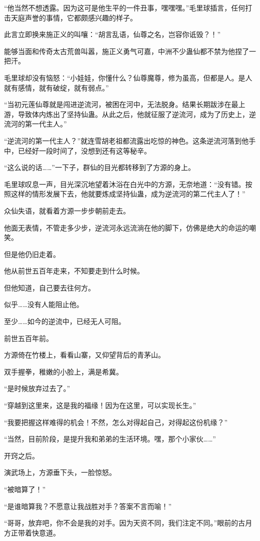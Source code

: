 \begin{this_body}
“他当然不想透露。因为这可是他生平的一件丑事，嘿嘿嘿。”毛里球插言，任何打击天庭声誉的事情，它都颇感兴趣的样子。

此言立即换来施正义的叫嚷：“胡言乱语，仙尊之名，岂容你诋毁？！”

能够当面和传奇太古荒兽叫嚣，施正义勇气可嘉，中洲不少蛊仙都不禁为他捏了一把汗。

毛里球却没有恼怒：“小娃娃，你懂什么？仙尊魔尊，修为虽高，但都是人。是人就有感情，就有破绽，就有弱点。”

“当初元莲仙尊就是闯进逆流河，被困在河中，无法脱身。结果长期跋涉在最上游，导致体内炼出了坚持仙蛊。从此之后，他就征服了逆流河，成为了历史上，逆流河的第一代主人。”

“逆流河的第一代主人？”就连雪胡老祖都流露出吃惊的神色。这条逆流河落到他手中，已经好一段时间了，没想到还有这等秘辛。

“这么说的话……”一下子，群仙的目光都转移到了方源的身上。

毛里球叹息一声，目光深沉地望着沐浴在白光中的方源，无奈地道：“没有错。按照这样的情形发展下去，他就要炼成坚持仙蛊，成为逆流河的第二代主人了！”

众仙失语，就看着方源一步步朝前走去。

他面无表情，不管走多少步，逆流河永远流淌在他的脚下，仿佛是绝大的命运的嘲笑。

但是他仍旧走着。

他从前世五百年走来，不知要走到什么时候。

但他知道，自己要去往何方。

似乎……没有人能阻止他。

至少……如今的逆流中，已经无人可阻。

前世五百年前。

方源倚在竹楼上，看看山寨，又仰望背后的青茅山。

双手握拳，稚嫩的小脸上，满是希冀。

“是时候放弃过去了。”

“穿越到这里来，这是我的福缘！因为在这里，可以实现长生。”

“我要把握这样难得的机会！不然，怎么对得起自己，对得起这份机缘？”

“当然，目前阶段，是提升我和弟弟的生活环境。嘿，那个小家伙……”

开窍之后。

演武场上，方源垂下头，一脸惊怒。

“被暗算了！”

“是谁暗算我？不愿意让我战胜对手？答案不言而喻！”

“哥哥，放弃吧，你不会是我的对手。因为天资不同，我们注定不同。”眼前的古月方正带着快意道。


\end{this_body}
